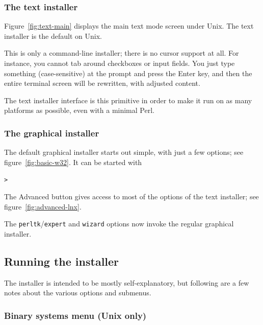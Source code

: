 \documentclass{article}
\begin{document}
\subsubsection{The text installer}

Figure~\ref{fig:text-main} displays the main text mode screen under
Unix.  The text installer is the default on Unix.

This is only a command-line installer; there is no cursor support at
all.  For instance, you cannot tab around checkboxes or input fields.
You just type something (case-sensitive) at the prompt and press the
Enter key, and then the entire terminal screen will be rewritten, with
adjusted content.

The text installer interface is this primitive in order to make it run
on as many platforms as possible, even with a minimal Perl.

\subsubsection{The graphical installer}
\label{sec:graphical-inst}

The default graphical installer starts out simple, with just a
few options; see figure~\ref{fig:basic-w32}. It can be started with
\begin{alltt}
> 
\end{alltt}
The Advanced button gives access to most of the options of the text
installer; see figure~\ref{fig:advanced-lnx}.

The \texttt{perltk}/\texttt{expert} and \texttt{wizard} \GUI{}
options now invoke the regular graphical installer.

\subsection{Running the installer}
\label{sec:runinstall}

The installer is intended to be mostly self-explanatory, but following are a
few notes about the various options and submenus.

\subsubsection{Binary systems menu (Unix only)}
\label{sec:binary}
\end{document}
